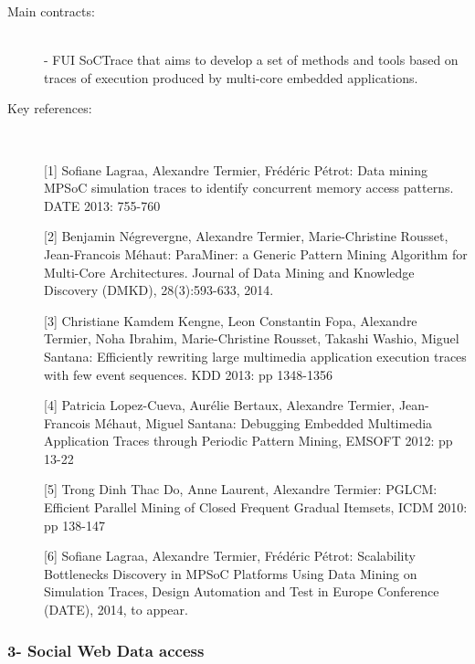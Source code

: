 \begin{description}

\item[Main contracts:] \ \\
- FUI SoCTrace that  aims to develop a set of methods and tools based on traces of execution produced by multi-core embedded applications. 
  
\item[Key references:]~%

[1] Sofiane Lagraa, Alexandre Termier, Fr{\'e}d{\'e}ric P{\'e}trot: Data mining MPSoC simulation traces to identify concurrent memory access patterns. DATE 2013: 755-760

[2] Benjamin N{\'e}grevergne, Alexandre Termier, Marie-Christine Rousset, Jean-Francois M{\'e}haut: ParaMiner: a Generic Pattern Mining Algorithm for Multi-Core Architectures. Journal of Data Mining and Knowledge Discovery (DMKD), 28(3):593-633, 2014. 

[3] Christiane Kamdem Kengne, Leon Constantin Fopa, Alexandre Termier, Noha Ibrahim, Marie-Christine Rousset, Takashi Washio, Miguel Santana: Efficiently rewriting large multimedia application execution traces with few event sequences. KDD 2013: pp 1348-1356

[4] Patricia Lopez-Cueva, Aur{\'e}lie Bertaux, Alexandre Termier, Jean-Francois M{\'e}haut, Miguel Santana: Debugging Embedded Multimedia Application Traces through Periodic Pattern Mining, EMSOFT 2012: pp 13-22

[5] Trong Dinh Thac Do, Anne Laurent, Alexandre Termier: PGLCM: Efficient Parallel Mining of Closed Frequent Gradual Itemsets, ICDM 2010: pp 138-147

[6] Sofiane Lagraa, Alexandre Termier, Fr{\'e}d{\'e}ric P{\'e}trot: Scalability Bottlenecks Discovery in MPSoC Platforms Using Data Mining on Simulation Traces, Design Automation and Test in Europe Conference (DATE), 2014, to appear.

\end{description}

\subsubsection*{3- Social Web Data access}

